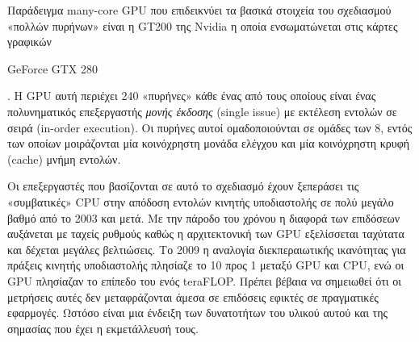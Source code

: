 Παράδειγμα many-core GPU που επιδεικνύει τα βασικά στοιχεία του σχεδιασμού «πολλών πυρήνων» είναι η GT200 της Nvidia η οποία ενσωματώνεται στις κάρτες γραφικών \begin{english}GeForce GTX 280\end{english}. Η GPU αυτή περιέχει 240 «πυρήνες» κάθε ένας από τους οποίους είναι ένας πολυνηματικός επεξεργαστής \textit{μονής έκδοσης} (single issue) με εκτέλεση εντολών σε σειρά (in-order execution). Οι πυρήνες αυτοί ομαδοποιούνται σε ομάδες των 8, εντός των οποίων μοιράζονται μία κοινόχρηστη μονάδα ελέγχου και μία κοινόχρηστη κρυφή (cache) μνήμη εντολών. 

Οι επεξεργαστές που βασίζονται σε αυτό το σχεδιασμό έχουν ξεπεράσει τις «συμβατικές» CPU στην απόδοση εντολών κινητής υποδιαστολής σε πολύ μεγάλο βαθμό από το 2003 και μετά. Με την πάροδο του χρόνου η διαφορά των επιδόσεων αυξάνεται με ταχείς ρυθμούς καθώς η αρχιτεκτονική των GPU εξελίσσεται ταχύτατα και δέχεται μεγάλες βελτιώσεις. Το 2009 η αναλογία διεκπεραιωτικής ικανότητας για πράξεις κινητής υποδιαστολής πλησίαζε το 10 προς 1 μεταξύ GPU και CPU, ενώ οι GPU πλησίαζαν το επίπεδο του ενός teraFLOP. Πρέπει βέβαια να σημειωθεί ότι οι μετρήσεις αυτές δεν μεταφράζονται άμεσα σε επιδόσεις εφικτές σε πραγματικές εφαρμογές. Ωστόσο είναι μια ένδειξη των δυνατοτήτων του υλικού αυτού και της σημασίας που έχει η εκμετάλλευσή τους.

